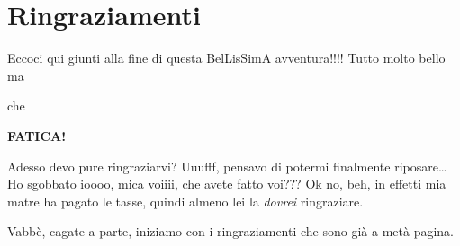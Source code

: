 
\chapter*{Ringraziamenti}
\thispagestyle{plain}

Eccoci qui giunti alla fine di questa BelLisSimA avventura!!!!
Tutto molto bello ma
\begin{center}
    che

    \textbf{FATICA!}
\end{center}

Adesso devo pure ringraziarvi? Uuufff, pensavo di potermi finalmente riposare\dots
Ho sgobbato ioooo, mica voiiii, che avete fatto voi???
Ok no, beh, in effetti mia matre ha pagato le tasse, quindi almeno lei la \emph{dovrei} ringraziare.

Vabbè, cagate a parte, iniziamo con i ringraziamenti che sono già a metà pagina.

